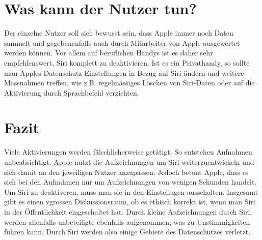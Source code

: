 \documentclass{article}
\begin{document}
\section{Was kann der Nutzer tun?}
Der einzelne Nutzer soll sich bewusst sein, dass Apple immer noch Daten sammelt und gegebenenfalls auch durch Mitarbeiter von Apple ausgewertet werden können. Vor allem auf beruflichen Handys ist es daher sehr empfehlenswert, Siri komplett zu deaktivieren. Ist es ein Privathandy, so sollte man Apples Datenschutz Einstellungen in Bezug auf Siri ändern und weitere Massnahmen treffen, wie z.B. regelmässiges Löschen von Siri-Daten oder auf die Aktivierung durch Sprachbefehl verzichten. 

\section{Fazit}
Viele Aktivierungen werden fälschlicherweise getätigt. So entstehen Aufnahmen unbeabsichtigt. Apple nutzt die Aufzeichnungen um Siri weiterzuentwickeln und sich damit an den jeweiligen Nutzer anzupassen. Jedoch betont Apple, dass es sich bei den Aufnahmen nur um Aufzeichnungen von wenigen Sekunden handelt. Um Siri zu deaktiveren, muss man sie in den Einstellugen ausschalten.
Insgesamt gibt es einen vgrossen Diskussionsraum, ob es ethisch korrekt ist, wenn man Siri in der Öffentlichkeit eingeschaltet hat. Durch kleine Aufzeichnungen durch Siri, werden allenfalls unbeteiligte ebenfalls aufgenommen, was zu Unstimmigkeiten führen kann. Durch Siri werden also einige Gebiete des Datenschutzes verletzt.

\nocite{*}
\printbibliography
\end{document}
